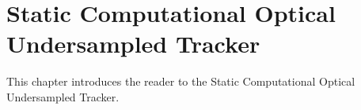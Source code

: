\chapter{Static Computational Optical Undersampled Tracker}\label{chap:Scout}

This chapter introduces the reader to the Static Computational Optical Undersampled Tracker.


%  
%



